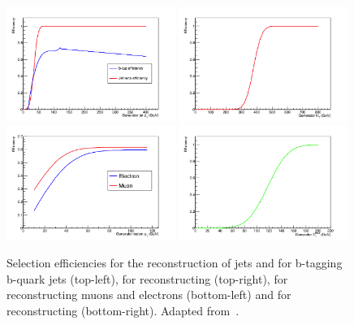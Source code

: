 \begin{figure}[ht!]
\begin{center}
\includegraphics[width=0.49\textwidth]{images/Pheno/BTagEff.png}
\includegraphics[width=0.49\textwidth]{images/Pheno/HTEff.png}\\
\includegraphics[width=0.49\textwidth]{images/Pheno/LeptonEff.png}
\includegraphics[width=0.49\textwidth]{images/Pheno/METEff.png}
\end{center}
\caption{Selection efficiencies for the reconstruction of jets and for b-tagging b-quark jets (top-left), for reconstructing \HT (top-right), for reconstructing muons and electrons (bottom-left) and for reconstructing \MET (bottom-right). Adapted from~\cite{Chatrchyan:2013fea}.}
\label{fig:effGraphs}
\end{figure}
